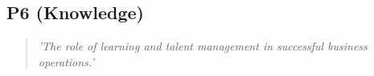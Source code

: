\subsection*{P6 (Knowledge)}

  \begin{quote}
    \textit{'The role of learning and talent
    management in successful business operations.'}
  \end{quote}

\newpage
